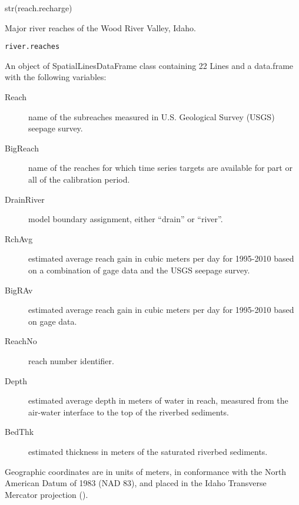 \documentclass[a4paper]{book}
\begin{document}
%
\begin{Examples}
\begin{ExampleCode}
str(reach.recharge)

\end{ExampleCode}
\end{Examples}
%
\begin{Description}\relax
Major river reaches of the Wood River Valley, Idaho.
\end{Description}
%
\begin{Usage}
\begin{verbatim}
river.reaches
\end{verbatim}
\end{Usage}
%
\begin{Format}
An object of SpatialLinesDataFrame class containing 22 Lines and a
data.frame with the following variables:
\begin{description}

\item[Reach] name of the subreaches measured in U.S. Geological Survey (USGS)
seepage survey.
\item[BigReach] name of the reaches for which time series targets are available for
part or all of the calibration period.
\item[DrainRiver] model boundary assignment, either ``drain'' or ``river''.
\item[RchAvg] estimated average reach gain in cubic meters per day for 1995-2010
based on a combination of gage data and the USGS seepage survey.
\item[BigRAv] estimated average reach gain in cubic meters per day for 1995-2010
based on gage data.
\item[ReachNo] reach number identifier.
\item[Depth] estimated average depth in meters of water in reach,
measured from the air-water interface to the top of the riverbed sediments.
\item[BedThk] estimated thickness in meters of the saturated riverbed sediments.

\end{description}

Geographic coordinates are in units of meters, in conformance with the
North American Datum of 1983 (NAD 83), and placed in the
Idaho Transverse Mercator projection ().
\end{Format}
\end{document}
